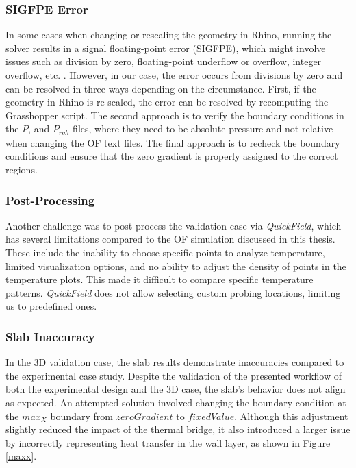 \subsubsection{SIGFPE Error}
In some cases when changing or rescaling the geometry in Rhino, running the solver results in a signal floating-point error (SIGFPE), which might involve issues such as division by zero, floating-point underflow or overflow, integer overflow, etc. \cite{sigfpe}. However, in our case, the error occurs from divisions by zero and can be resolved in three ways depending on the circumstance. First, if the geometry in Rhino is re-scaled, the error can be resolved by recomputing the Grasshopper script. The second approach is to verify the boundary conditions in the $P$, and $P_{rgh}$ files, where they need to be absolute pressure and not relative when changing the \gls{OF} text files. The final approach is to recheck the boundary conditions and ensure that the zero gradient is properly assigned to the correct regions.

\subsubsection{Post-Processing}
Another challenge was to post-process the validation case via \textit{QuickField}, which has several limitations compared to the \gls{OF} simulation discussed in this thesis. 
These include the inability to choose specific points to analyze temperature, limited visualization options, and no ability to adjust the density of points in the temperature plots. This made it difficult to compare specific temperature patterns.
\textit{QuickField} does not allow selecting custom probing locations, limiting us to predefined ones.

\subsubsection{Slab Inaccuracy}
In the 3D validation case, the slab results demonstrate inaccuracies compared to the experimental case study. Despite the validation of the presented workflow of both the experimental design and the 3D case, the slab's behavior does not align as expected. An attempted solution involved changing the boundary condition at the $max_X$ boundary from $zeroGradient$ to $fixedValue$.
Although this adjustment slightly reduced the impact of the thermal bridge, it also introduced a larger issue by incorrectly representing heat transfer in the wall layer, as shown in Figure \ref{maxx}.


